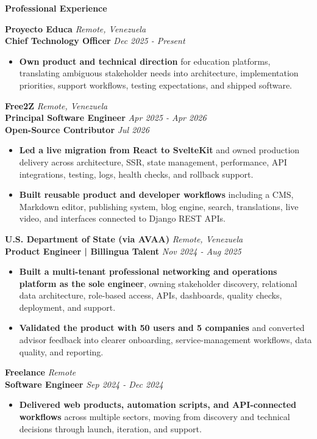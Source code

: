 \documentclass[10pt]{article}
\newcommand{\sectiontitle}[1]{%
    \vspace{3pt}
    \begin{center}
        \textbf{#1}
    \end{center}
    \vspace{-5pt}
}
\begin{document}
\sectiontitle{Professional Experience}
\textbf{Proyecto Educa} \hfill \textit{Remote, Venezuela} \\
\textbf{Chief Technology Officer} \hfill \textit{Dec 2025 - Present}
\begin{itemize}
    \item \textbf{Own product and technical direction} for education platforms, translating ambiguous stakeholder needs into architecture, implementation priorities, support workflows, testing expectations, and shipped software.
\end{itemize}

\vspace{1pt}
\textbf{Free2Z} \hfill \textit{Remote, Venezuela} \\
\textbf{Principal Software Engineer} \hfill \textit{Apr 2025 - Apr 2026} \\
\textbf{Open-Source Contributor} \hfill \textit{Jul 2026}
\begin{itemize}
    \item \textbf{Led a live migration from React to SvelteKit} and owned production delivery across architecture, SSR, state management, performance, API integrations, testing, logs, health checks, and rollback support.
    \item \textbf{Built reusable product and developer workflows} including a CMS, Markdown editor, publishing system, blog engine, search, translations, live video, and interfaces connected to Django REST APIs.
\end{itemize}

\vspace{1pt}
\textbf{U.S. Department of State (via AVAA)} \hfill \textit{Remote, Venezuela} \\
\textbf{Product Engineer | Billingua Talent} \hfill \textit{Nov 2024 - Aug 2025}
\begin{itemize}
    \item \textbf{Built a multi-tenant professional networking and operations platform as the sole engineer}, owning stakeholder discovery, relational data architecture, role-based access, APIs, dashboards, quality checks, deployment, and support.
    \item \textbf{Validated the product with 50 users and 5 companies} and converted advisor feedback into clearer onboarding, service-management workflows, data quality, and reporting.
\end{itemize}

\vspace{1pt}
\textbf{Freelance} \hfill \textit{Remote} \\
\textbf{Software Engineer} \hfill \textit{Sep 2024 - Dec 2024}
\begin{itemize}
    \item \textbf{Delivered web products, automation scripts, and API-connected workflows} across multiple sectors, moving from discovery and technical decisions through launch, iteration, and support.
\end{itemize}
\end{document}
